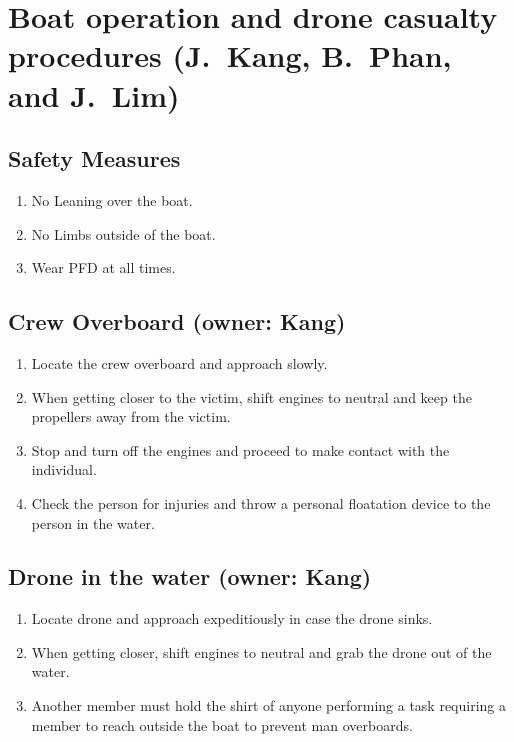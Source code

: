 \clearpage
\section{Boat operation and drone casualty procedures (J.~Kang, B.~Phan, and J.~Lim)}
\label{app:CP}

\subsection{Safety Measures}
\begin{enumerate}
\setlength{\itemsep}{0em}
\setlength{\parskip}{0em}
\item No Leaning over the boat. 
\item No Limbs outside of the boat. 
\item Wear PFD at all times.
\end{enumerate}


\subsection{Crew Overboard (owner: Kang)}
\begin{enumerate}
\setlength{\itemsep}{0em}
\setlength{\parskip}{0em}
\item Locate the crew overboard and approach slowly. 
\item When getting closer to the victim, shift engines to neutral and keep the propellers away from the victim. 
\item Stop and turn off the engines and proceed to make contact with the individual. 
\item Check the person for injuries and throw a personal floatation device to the person in the water.
\end{enumerate}


\subsection{Drone in the water (owner: Kang)}
\begin{enumerate}
\setlength{\itemsep}{0em}
\setlength{\parskip}{0em}
\item Locate drone and approach expeditiously in case the drone sinks. 
\item When getting closer, shift engines to neutral and grab the drone out of the water. 
\item Another member must hold the shirt of anyone performing a task requiring a member to reach outside the boat to prevent man overboards.
\end{enumerate}



